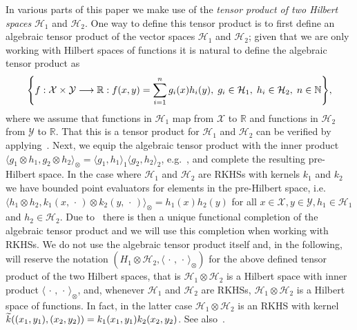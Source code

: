 \documentclass[10pt]{amsart}
\theoremstyle{definition}\newtheorem{defi}[theo]{Definition}\newtheorem{rema}[theo]{Remark}\newtheorem{exam}[theo]{Example}\newtheorem{exem}[theo]{Example}\newtheorem{nota}[theo]{Notation}
\theoremstyle{remark}
\newcommand{\R}{\mathbb{R}}
\newcommand{\bbN}{\mathbb{N}}
\newcommand{\X}{\mathcal{X}}
\newcommand{\Y}{\mathcal{Y}}
\newcommand{\cH}{\mathcal{H}}
\let\oldtilde\tilde
\renewcommand*{\tilde}[1]{\mathchoice{\widetilde{#1}}{\widetilde{#1}}{\oldtilde{#1}}{\oldtilde{#1}}}
\renewcommand*{\to}{\mathchoice{\longrightarrow}{\rightarrow}{\rightarrow}{\rightarrow}}
\let\originalleft\left
\let\originalright\right
\renewcommand{\left}{\mathopen{}\mathclose\bgroup\originalleft}
\renewcommand{\right}{\aftergroup\egroup\originalright}
\begin{document}
In various parts of this paper we make use of the \emph{tensor product of two Hilbert spaces} $\cH_1$ and $\cH_2$. One way to define this tensor product is to first define an algebraic tensor product of the vector spaces $\cH_1$ and $\cH_2$; given that we are only working with Hilbert spaces of functions it is natural to define the algebraic tensor product as
\[
\left\{f:\X \times \Y \to \R : f(x,y) = \sum_{i=1}^n g_i(x) h_i(y),\; g_i \in \cH_1,\; h_i \in \cH_2,\; n\in \bbN \right\},
\]
where we assume that functions in $\cH_1$ map from $\X$ to $\R$ and functions in $\cH_2$ from $\Y$ to $\R$. That this is a tensor product for $\cH_1$ and $\cH_2$ can be verified by applying~\cite[Criterion~2.3]{DEF92}. Next, we equip the algebraic tensor product with the inner product $ \langle g_1 \otimes h_1, g_2 \otimes h_2 \rangle_\otimes = \langle g_1, h_1 \rangle_1 \langle g_2, h_2 \rangle_2$, e.g.~\cite[Theorem~6.3.1]{MUR90}, and complete the resulting pre-Hilbert space. In the case where $\cH_1$ and $\cH_2$ are RKHSs with kernels $k_1$ and $k_2$ we have bounded point evaluators for elements in the pre-Hilbert space, i.e. $\langle h_1 \otimes h_2, k_1(x,\,\cdot\,) \otimes k_2(y,\,\cdot\,) \rangle_\otimes = h_1(x) h_2(y)$ for all $x \in \X, y\in \Y, h_1 \in \cH_1$ and $h_2 \in \cH_2$. Due to~\cite[2nd theorem, \S4 p.~347]{ARON50} there is then a unique functional completion of the algebraic tensor product and we will use this completion when working with RKHSs. We do not use the algebraic tensor product itself and, in the following, will reserve the notation $(H_1 \otimes \cH_2, \langle \,\cdot\,,\,\cdot\, \rangle_\otimes)$ for the above defined tensor product of the two Hilbert spaces, that is $\cH_1 \otimes \cH_2$ is a Hilbert space with inner product $\langle \,\cdot\,,\,\cdot\, \rangle_\otimes$, and, whenever $\cH_1$ and $\cH_2$ are RKHSs, $\cH_1 \otimes \cH_2$ is a Hilbert space of functions. In fact, in the latter case $\cH_1 \otimes \cH_2$ is an RKHS with kernel $\tilde k((x_1,y_1),(x_2,y_2)) = k_1(x_1,y_1) k_2(x_2,y_2)$. See also~\cite[Theorem~5.11]{PAUL16}.
\end{document}
